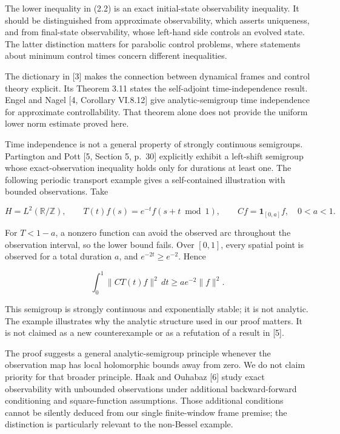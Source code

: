 \documentclass[
  11pt,
]{article}
\begin{document}
The lower inequality in (2.2) is an exact initial-state observability
inequality. It should be distinguished from approximate observability,
which asserts uniqueness, and from final-state observability, whose
left-hand side controls an evolved state. The latter distinction matters
for parabolic control problems, where statements about minimum control
times concern different inequalities.

The dictionary in {[}3{]} makes the connection between dynamical frames
and control theory explicit. Its Theorem 3.11 states the self-adjoint
time-independence result. Engel and Nagel {[}4, Corollary VI.8.12{]}
give analytic-semigroup time independence for approximate
controllability. That theorem alone does not provide the uniform lower
norm estimate proved here.

Time independence is not a general property of strongly continuous
semigroups. Partington and Pott {[}5, Section 5, p.~30{]} explicitly
exhibit a left-shift semigroup whose exact-observation inequality holds
only for durations at least one. The following periodic transport
example gives a self-contained illustration with bounded observations.
Take

\[
H=L^2(\mathbb R/\mathbb Z),\qquad
T(t)f(s)=e^{-t}f(s+t\bmod1),\qquad
Cf=\mathbf1_{[0,a]}f,
\quad0<a<1.
\]

For \(T<1-a\), a nonzero function can avoid the observed arc throughout
the observation interval, so the lower bound fails. Over \([0,1]\),
every spatial point is observed for a total duration \(a\), and
\(e^{-2t}\geq e^{-2}\). Hence

\[
\int_0^1\|CT(t)f\|^2\,dt\geq ae^{-2}\|f\|^2.
\]

This semigroup is strongly continuous and exponentially stable; it is
not analytic. The example illustrates why the analytic structure used in
our proof matters. It is not claimed as a new counterexample or as a
refutation of a result in {[}5{]}.

The proof suggests a general analytic-semigroup principle whenever the
observation map has local holomorphic bounds away from zero. We do not
claim priority for that broader principle. Haak and Ouhabaz {[}6{]}
study exact observability with unbounded observations under additional
backward-forward conditioning and square-function assumptions. Those
additional conditions cannot be silently deduced from our single
finite-window frame premise; the distinction is particularly relevant to
the non-Bessel example.
\end{document}
